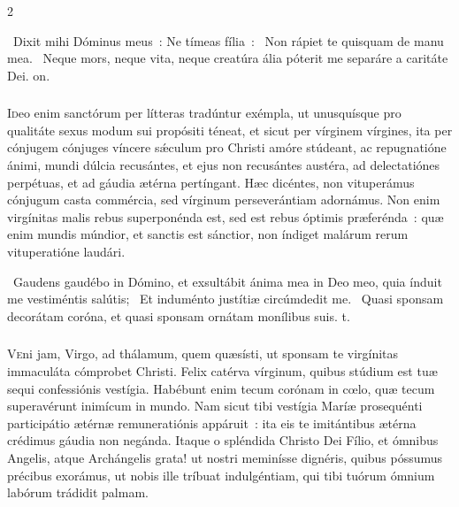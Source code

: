 \documentclass[9pt,twoside]{extarticle}
\begin{document}
\begin{multicols}{2}
{\begin{tightlist}{}
\item {}~Dixit mihi Dóminus meus~: Ne tímeas fília~: \textred{*}~Non rápiet te quisquam de manu mea. ~Neque mors, neque vita, neque creatúra ália póterit me separáre a caritáte Dei. on.
\end{tightlist}

\subsubsection*{\center {}}
\lettrine{I}deo enim sanctórum per lítteras tradúntur exémpla, ut unusquísque pro qualitáte sexus modum sui propósiti téneat, et sicut per vírginem vírgines, ita per cónjugem cónjuges víncere sǽculum pro Christi amóre stúdeant, ac repugnatióne ánimi, mundi dúlcia recusántes, et ejus non recusántes austéra, ad delectatiónes perpétuas, et ad gáudia ætérna pertíngant. Hæc dicéntes, non vituperámus cónjugum casta commércia, sed vírginum perseverántiam adornámus. Non enim virgínitas malis rebus superponénda est, sed est rebus óptimis præferénda~: quæ enim mundis múndior, et sanctis est sánctior, non índiget malárum rerum vituperatióne laudári.

\begin{tightlist}{}
\item {}~Gaudens gaudébo in Dómino, et exsultábit ánima mea in Deo meo, quia índuit me vestiméntis salútis; \textred{*}~Et induménto justítiæ circúmdedit me. ~Quasi sponsam decorátam coróna, et quasi sponsam ornátam monílibus suis. t.
\end{tightlist}

\subsubsection*{\center {}}
\lettrine{V}eni jam, Virgo, ad thálamum, quem quæsísti, ut sponsam te virgínitas immaculáta cómprobet Christi. Felix catérva vírginum, quibus stúdium est tuæ sequi confessiónis vestígia. Habébunt enim tecum corónam in cœlo, quæ tecum superavérunt inimícum in mundo. Nam sicut tibi vestígia Maríæ prosequénti participátio ætérnæ remuneratiónis appáruit~: ita eis te imitántibus ætérna crédimus gáudia non negánda. Itaque o spléndida Christo Dei Fílio, et ómnibus Angelis, atque Archángelis grata! ut nostri meminísse dignéris, quibus póssumus précibus exorámus, ut nobis ille tríbuat indulgéntiam, qui tibi tuórum ómnium labórum trádidit palmam. 

}
\end{multicols}
\end{document}
